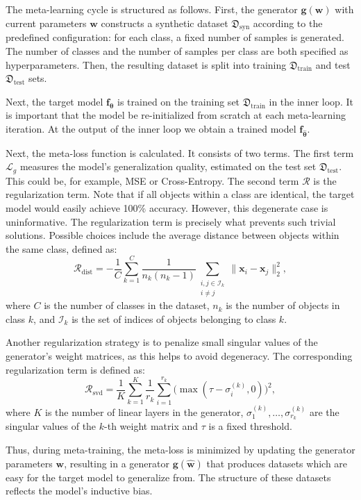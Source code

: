 \documentclass{article}
\begin{document}
The meta-learning cycle is structured as follows. First, the generator $\mathbf{g}(\mathbf{w})$ with current  parameters $\mathbf{w}$ constructs a synthetic dataset $\mathfrak{D}_{\text{syn}}$ according to the predefined configuration: for each class, a fixed number of samples is generated. The number of classes and the number of samples per class are both specified as hyperparameters. Then, the resulting dataset is split into training $\mathfrak{D}_{\text{train}}$ and test $\mathfrak{D}_{\text{test}}$ sets.

Next, the target model $\mathbf{f}_{\boldsymbol{\theta}}$ is trained on the training set $\mathfrak{D}_{\text{train}}$ in the inner loop. It is important that the model be re-initialized from scratch at each meta-learning iteration. At the output of the inner loop we obtain a trained model $\mathbf{f}_{\boldsymbol{\hat\theta}}$.

Next, the meta-loss function is calculated. It consists of two terms. The first term $\mathcal{L}_g$ measures the model's generalization quality, estimated on the test set $\mathfrak{D}_{\text{test}}$. This could be, for example, MSE or Cross-Entropy. The second term $\mathcal{R}$ is the regularization term. Note that if all objects within a class are identical, the target model would easily achieve 100\% accuracy. However, this degenerate case is uninformative. The regularization term is precisely what prevents such trivial solutions. Possible choices include the average distance between objects within the same class, defined as:
\[
\mathcal{R}_{\text{dist}} = - \frac{1}{C} \sum_{k=1}^{C} \frac{1}{n_k(n_k - 1)} \sum_{\substack{i,j \in \mathcal{I}_k \\ i \neq j}} \|\mathbf{x}_i - \mathbf{x}_j\|_2^2,
\]
where $C$ is the number of classes in the dataset, $n_k$ is the number of objects in class $k$, and $\mathcal{I}_k$ is the set of indices of objects belonging to class $k$.

Another regularization strategy is to penalize small singular values of the generator's weight matrices, as this helps to avoid degeneracy. The corresponding regularization term is defined as:
\[
\mathcal{R}_{\text{svd}} = \frac{1}{K} \sum_{k=1}^{K} \frac{1}{r_k} \sum_{i=1}^{r_k} \bigl(\max(\tau - \sigma_i^{(k)}, 0)\bigr)^2,
\]
where $K$ is the number of linear layers in the generator, $\sigma_1^{(k)}, \dots, \sigma_{r_k}^{(k)}$ are the singular values of the $k$-th weight matrix and $\tau$ is a fixed threshold.

Thus, during meta-training, the meta-loss is minimized by updating the generator parameters $\mathbf{w}$, resulting in a generator $\mathbf{g}(\mathbf{\hat w})$ that produces datasets which are easy for the target model to generalize from. The structure of these datasets reflects the model's inductive bias.
\end{document}
